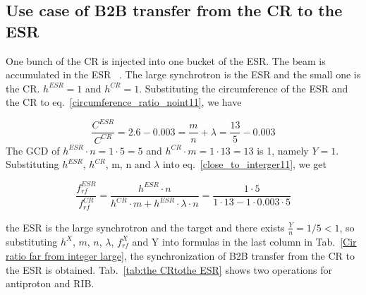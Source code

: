 \subsection{Use case of B2B transfer from the CR to the ESR} 

One bunch of the CR is injected into one bucket of the ESR. The beam is accumulated in the ESR ~\cite{toelle_hesr_2007}. The large synchrotron is the ESR and the small one is the CR. $h^{\mathit{ESR}}=1$ and $h^{\mathit{CR}}=1$. Substituting the circumference of the ESR and the CR to eq.~\ref{circumference_ratio_noint11}, we have

\begin{equation}
\frac{C^{\mathit{ESR}}}{C^{\mathit{CR}}}=2.6-0.003=\frac{m}{n}+ \lambda = \frac{13}{5}-0.003
\end{equation}
The GCD of $h^{\mathit{ESR}}\cdot n=1\cdot5=5$ and $h^{\mathit{CR}} \cdot m=1\cdot 13=13$ is 1, namely $Y=1$. Substituting $h^{\mathit{ESR}}$, $h^{\mathit{CR}}$, m, n and $\lambda$ into eq.~\ref{close_to_interger11}, we get

\begin{equation} 
\frac{f_{\mathit{rf}}^{\mathit{ESR}}}{f_{\mathit{rf}}^{\mathit{CR}}}=\frac{h^{\mathit{ESR}}\cdot n}{h^{\mathit{CR}} \cdot m+ h^{\mathit{ESR}} \cdot\lambda\cdot n}=\frac{1\cdot 5}{1 \cdot 13- 1 \cdot 0.003\cdot 5}
\end{equation}

the ESR is the large synchrotron and the target and there exists $\frac{Y}{n}=1/5<1$, so substituting $h^X$, $m$, $n$, $\lambda$, $f_{\mathit{rf}}^{X}$ and Y into formulas in the last column in Tab.~\ref{Cir ratio far from integer large}, the synchronization of B2B transfer from the CR to the ESR is obtained. Tab.~\ref{tab:the CRtothe ESR} shows two operations for antiproton and RIB.


